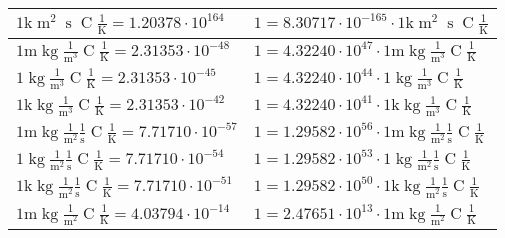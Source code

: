 \begin{center}
\begin{longtable}{l l}
{\color{gray}$1 \bm{\mathrm{ k}}{\operatorname{m}^2}{\operatorname{s}}{\operatorname{C}}\frac1{\operatorname{K}} = 1.20378\cdot10^{164} $}   & {\color{gray}$ 1 = 8.30717\cdot10^{-165} \cdot 1 \bm{\mathrm{ k}}{\operatorname{m}^2}{\operatorname{s}}{\operatorname{C}}\frac1{\operatorname{K}}$}  \\
\hline{\color{gray}$1 \bm{\mathrm{ m}}\operatorname{kg}\frac1{\operatorname{m}^3}{}{\operatorname{C}}\frac1{\operatorname{K}} = 2.31353\cdot10^{-48} $}   & {\color{gray}$ 1 = 4.32240\cdot10^{47} \cdot 1 \bm{\mathrm{ m}}\operatorname{kg}\frac1{\operatorname{m}^3}{}{\operatorname{C}}\frac1{\operatorname{K}}$}  \\
{\color{black}$1 \bm{\mathrm{ }}\operatorname{kg}\frac1{\operatorname{m}^3}{}{\operatorname{C}}\frac1{\operatorname{K}} = 2.31353\cdot10^{-45} $}   & {\color{black}$ 1 = 4.32240\cdot10^{44} \cdot 1 \bm{\mathrm{ }}\operatorname{kg}\frac1{\operatorname{m}^3}{}{\operatorname{C}}\frac1{\operatorname{K}}$}  \\
{\color{gray}$1 \bm{\mathrm{ k}}\operatorname{kg}\frac1{\operatorname{m}^3}{}{\operatorname{C}}\frac1{\operatorname{K}} = 2.31353\cdot10^{-42} $}   & {\color{gray}$ 1 = 4.32240\cdot10^{41} \cdot 1 \bm{\mathrm{ k}}\operatorname{kg}\frac1{\operatorname{m}^3}{}{\operatorname{C}}\frac1{\operatorname{K}}$}  \\
{\color{gray}$1 \bm{\mathrm{ m}}\operatorname{kg}\frac1{\operatorname{m}^2}\frac1{\operatorname{s}}{\operatorname{C}}\frac1{\operatorname{K}} = 7.71710\cdot10^{-57} $}   & {\color{gray}$ 1 = 1.29582\cdot10^{56} \cdot 1 \bm{\mathrm{ m}}\operatorname{kg}\frac1{\operatorname{m}^2}\frac1{\operatorname{s}}{\operatorname{C}}\frac1{\operatorname{K}}$}  \\
{\color{black}$1 \bm{\mathrm{ }}\operatorname{kg}\frac1{\operatorname{m}^2}\frac1{\operatorname{s}}{\operatorname{C}}\frac1{\operatorname{K}} = 7.71710\cdot10^{-54} $}   & {\color{black}$ 1 = 1.29582\cdot10^{53} \cdot 1 \bm{\mathrm{ }}\operatorname{kg}\frac1{\operatorname{m}^2}\frac1{\operatorname{s}}{\operatorname{C}}\frac1{\operatorname{K}}$}  \\
{\color{gray}$1 \bm{\mathrm{ k}}\operatorname{kg}\frac1{\operatorname{m}^2}\frac1{\operatorname{s}}{\operatorname{C}}\frac1{\operatorname{K}} = 7.71710\cdot10^{-51} $}   & {\color{gray}$ 1 = 1.29582\cdot10^{50} \cdot 1 \bm{\mathrm{ k}}\operatorname{kg}\frac1{\operatorname{m}^2}\frac1{\operatorname{s}}{\operatorname{C}}\frac1{\operatorname{K}}$}  \\
{\color{gray}$1 \bm{\mathrm{ m}}\operatorname{kg}\frac1{\operatorname{m}^2}{}{\operatorname{C}}\frac1{\operatorname{K}} = 4.03794\cdot10^{-14} $}   & {\color{gray}$ 1 = 2.47651\cdot10^{13} \cdot 1 \bm{\mathrm{ m}}\operatorname{kg}\frac1{\operatorname{m}^2}{}{\operatorname{C}}\frac1{\operatorname{K}}$}  \\

\end{longtable}
\end{center}
